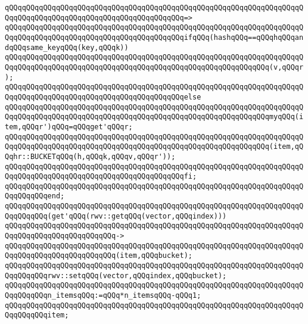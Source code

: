 \verb|qQQqqQQqqQQqqQQqqQQqqQQqqQQqqQQqqQQqqQQqqQQqqQQqqQQqqQQqqQQqqQQqqQQqqQQqqQQqqQQqqQQqqQQqqQQqqQQqqQQqqQQqqQQqqQQq=>|\newline
\verb|qQQqqQQqqQQqqQQqqQQqqQQqqQQqqQQqqQQqqQQqqQQqqQQqqQQqqQQqqQQqqQQqqQQqqQQqqQQqqQQqqQQqqQQqqQQqqQQqqQQqqQQqqQQqqQQqifqQQq(hashqQQq==qQQqhqQQqandqQQqsame_keyqQQq(key,qQQqk))|\newline
\verb|qQQqqQQqqQQqqQQqqQQqqQQqqQQqqQQqqQQqqQQqqQQqqQQqqQQqqQQqqQQqqQQqqQQqqQQqqQQqqQQqqQQqqQQqqQQqqQQqqQQqqQQqqQQqqQQqqQQqqQQqqQQqqQQqqQQq(v,qQQqr);|\newline
\verb|qQQqqQQqqQQqqQQqqQQqqQQqqQQqqQQqqQQqqQQqqQQqqQQqqQQqqQQqqQQqqQQqqQQqqQQqqQQqqQQqqQQqqQQqqQQqqQQqqQQqqQQqqQQqqQQqelse|\newline
\verb|qQQqqQQqqQQqqQQqqQQqqQQqqQQqqQQqqQQqqQQqqQQqqQQqqQQqqQQqqQQqqQQqqQQqqQQqqQQqqQQqqQQqqQQqqQQqqQQqqQQqqQQqqQQqqQQqqQQqqQQqqQQqqQQqqQQqmyqQQq(item,qQQqr')qQQq=qQQqget'qQQqr;|\newline
\verb|qQQqqQQqqQQqqQQqqQQqqQQqqQQqqQQqqQQqqQQqqQQqqQQqqQQqqQQqqQQqqQQqqQQqqQQqqQQqqQQqqQQqqQQqqQQqqQQqqQQqqQQqqQQqqQQqqQQqqQQqqQQqqQQqqQQq(item,qQQqhr::BUCKETqQQq(h,qQQqk,qQQqv,qQQqr'));|\newline
\verb|qQQqqQQqqQQqqQQqqQQqqQQqqQQqqQQqqQQqqQQqqQQqqQQqqQQqqQQqqQQqqQQqqQQqqQQqqQQqqQQqqQQqqQQqqQQqqQQqqQQqqQQqqQQqqQQqfi;|\newline
\verb|qQQqqQQqqQQqqQQqqQQqqQQqqQQqqQQqqQQqqQQqqQQqqQQqqQQqqQQqqQQqqQQqqQQqqQQqqQQqqQQqend;|\newline
\newline
\verb|qQQqqQQqqQQqqQQqqQQqqQQqqQQqqQQqqQQqqQQqqQQqqQQqqQQqqQQqqQQqqQQqqQQqqQQqqQQqqQQq(get'qQQq(rwv::getqQQq(vector,qQQqindex)))|\newline
\verb|qQQqqQQqqQQqqQQqqQQqqQQqqQQqqQQqqQQqqQQqqQQqqQQqqQQqqQQqqQQqqQQqqQQqqQQqqQQqqQQqqQQqqQQqqQQqqQQq->|\newline
\verb|qQQqqQQqqQQqqQQqqQQqqQQqqQQqqQQqqQQqqQQqqQQqqQQqqQQqqQQqqQQqqQQqqQQqqQQqqQQqqQQqqQQqqQQqqQQqqQQq(item,qQQqbucket);|\newline
\newline
\verb|qQQqqQQqqQQqqQQqqQQqqQQqqQQqqQQqqQQqqQQqqQQqqQQqqQQqqQQqqQQqqQQqqQQqqQQqqQQqqQQqrwv::setqQQq(vector,qQQqindex,qQQqbucket);|\newline
\verb|qQQqqQQqqQQqqQQqqQQqqQQqqQQqqQQqqQQqqQQqqQQqqQQqqQQqqQQqqQQqqQQqqQQqqQQqqQQqqQQqn_itemsqQQq:=qQQq*n_itemsqQQq-qQQq1;|\newline
\verb|qQQqqQQqqQQqqQQqqQQqqQQqqQQqqQQqqQQqqQQqqQQqqQQqqQQqqQQqqQQqqQQqqQQqqQQqqQQqqQQqitem;|\newline
